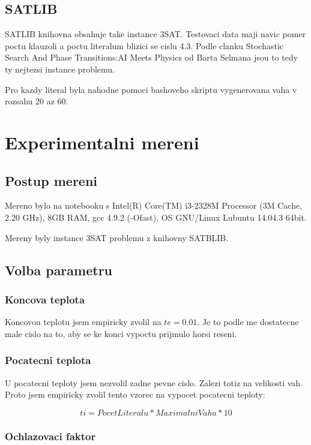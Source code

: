 \documentclass[12pt,a4paper]{article}
\begin{document}
\subsection{SATLIB}

SATLIB knihovna obsahuje take instance 3SAT. Testovaci data maji navic pomer poctu klauzoli a poctu literalum blizici se cislu 4.3. Podle clanku Stochastic Search And Phase Transitions:AI Meets Physics od Barta Selmana jsou to tedy ty nejtezsi instance problemu.

Pro kazdy literal byla nahodne pomoci bashoveho skriptu vygenerovana vaha v rozsahu 20 az 60.

\section{Experimentalni mereni}

\subsection{Postup mereni}
Mereno bylo na notebooku s Intel(R) Core(TM) i3-2328M Processor (3M Cache, 2.20 GHz), 8GB RAM, gcc 4.9.2 (-Ofast), OS GNU/Linux Lubuntu 14.04.3 64bit.

Mereny byly instance 3SAT problemu z knihovny SATBLIB.

\subsection{Volba parametru}

\subsubsection{Koncova teplota}
Koncovou teplotu jsem empiricky zvolil na $te = 0.01$. Je to podle me dostatecne male cislo na to, aby se ke konci vypoctu prijmulo horsi reseni.

\subsubsection{Pocatecni teplota}
U pocatecni teploty jsem nezvolil zadne pevne cislo. Zalezi totiz na velikosti vah. Proto jsem empiricky zvolil tento vzorec na vypocet pocatecni teploty:

$$ ti = PocetLiteralu * MaximalniVaha * 10 $$

\subsubsection{Ochlazovaci faktor}
\end{document}
